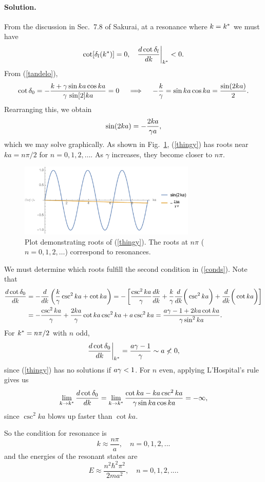 \documentclass[11pt]{article}
\newcommand{\refeq}[1]{(\ref{#1})}
\newcommand{\beq}{\begin{equation*}}
\newcommand{\eeq}{\end{equation*}}
\newcommand{\beqn}{\begin{equation}}
\newcommand{\eeqn}{\end{equation}}
\newenvironment{solution}
{
	\paragraph{Solution.}
}
{
	\bigskip
}
\newcommand{\qimplies}{\quad \implies \quad}
\begin{document}
\begin{solution}
	From the discussion in Sec.~7.8 of Sakurai, at a resonance where $k = k^*$ we must have
	\begin{align} \label{conds}
		\cot[\delta_l(k^*)] &= 0, &
		\left. \dv{\cot\delta_l}{k} \right|_{k^*} < 0.
	\end{align}
	From \refeq{tandelo},
	\beq
		\cot\delo = -\frac{k + \gam \sin ka \cos ka}{\gam \, \sin[2] ka} = 0
		\qimplies
		-\frac{k}{\gam} = \sin ka \cos ka = \frac{\sin(2ka)}{2}.
	\eeq
	Rearranging this, we obtain
	\beqn \label{thingy}
		\sin(2ka) = -\frac{2ka}{\gam a},
	\eeqn
	which we may solve graphically.  As shown in Fig.~\ref{plot3}, \refeq{thingy} has roots near $ka = n \pi / 2$ for $n = 0, 1, 2, \ldots$.  As $\gamma$ increases, they become closer to $n\pi$.
	
	\begin{figure} \centering
		\includegraphics[width=0.75\textwidth]{plot3}
		\caption{Plot demonstrating roots of \refeq{thingy}.  The roots at $n \pi$ ($n = 0, 1, 2, \ldots$) correspond to resonances.}
		\label{plot3}
	\end{figure}
	
	We must determine which roots fulfill the second condition in \refeq{conds}.  Note that
	\begin{align*}
		\dv{\cot\delta_0}{k} &= -\dv{k} \left( \frac{k}{\gamma} \csc^2 ka + \cot ka \right)
		= -\left[ \frac{\csc^2 ka}{\gamma} \dv{k}{k} + \frac{k}{\gamma} \dv{k} \bigg( \csc^2 ka \bigg) + \dv{k} \bigg( \cot ka \bigg) \right] \\
		&=  -\frac{\csc^2 ka}{\gamma} + \frac{2 ka}{\gamma} \cot ka \csc^2 ka + a \csc^2 ka
		= \frac{a\gamma - 1 + 2 ka \cot ka}{\gamma \sin^2 ka}.
	\end{align*}
	For $k^* = n\pi/2$ with $n$ odd,
	\beq
		\left. \dv{\cot\delo}{k} \right|_{\ks} = \frac{a \gam - 1}{\gam} \sim a \not< 0,
	\eeq
	since \refeq{thingy} has no solutions if $a \gamma < 1$.  For $n$ even, applying L'Hospital's rule gives us
	\beq
		\lim_{k \to \ks} \dv{\cot\delo}{k} = \lim_{k \to \ks} \frac{\cot ka - ka \csc^2 ka}{\gam \sin ka \cos ka} = -\infty,
	\eeq
	since $\csc^2 ka$ blows up faster than $\cot ka$.
	
	So the condition for resonance is
	\beq
		k \approx \frac{n \pi}{a}, \quad n = 0, 1, 2, ...
	\eeq
	and the energies of the resonant states are
	\beq
		E \approx \frac{n^2 \hbar^2 \pi^2}{2 m a^2}, \quad n = 0, 1, 2, ....
	\eeq
\end{solution}
\end{document}
